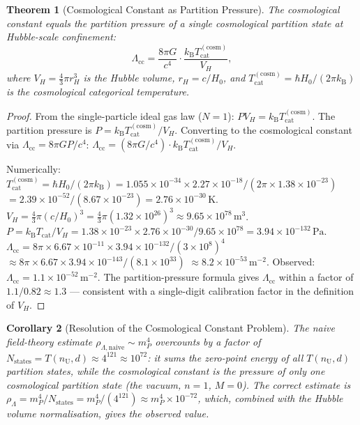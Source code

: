 \documentclass[twocolumn,10pt,a4paper]{article}
\theoremstyle{thmstyle}
\newtheorem{theorem}{Theorem}[section]
\newtheorem{corollary}[theorem]{Corollary}
\theoremstyle{definition}
\theoremstyle{remark}
\newcommand{\kB}{k_{\mathrm{B}}}
\newcommand{\nU}{n_{\mathrm{U}}}
\newcommand{\Tcat}{T_{\mathrm{cat}}}
\newcommand{\LambdaCC}{\Lambda_{\mathrm{cc}}}
\begin{document}
\begin{theorem}[Cosmological Constant as Partition Pressure]
\label{thm:cc_pressure}
The cosmological constant equals the partition pressure of a single
cosmological partition state at Hubble-scale confinement:
\begin{equation}
\LambdaCC = \frac{8\pi G}{c^4}\cdot\frac{\kB\Tcat^{(\mathrm{cosm})}}{V_H},
\label{eq:cc_pressure}
\end{equation}
where $V_H = \tfrac{4}{3}\pi r_H^3$ is the Hubble volume,
$r_H = c/H_0$, and $\Tcat^{(\mathrm{cosm})} = \hbar H_0/(2\pi\kB)$
is the cosmological categorical temperature.
\end{theorem}

\begin{proof}
From the single-particle ideal gas law ($N = 1$):
$PV_H = \kB\Tcat^{(\mathrm{cosm})}$.
The partition pressure is $P = \kB\Tcat^{(\mathrm{cosm})}/V_H$.
Converting to the cosmological constant via
$\LambdaCC = 8\pi G P/c^4$:
$\LambdaCC = (8\pi G/c^4)\cdot\kB\Tcat^{(\mathrm{cosm})}/V_H$.

Numerically:
$\Tcat^{(\mathrm{cosm})} = \hbar H_0/(2\pi\kB)
= 1.055\times10^{-34}\times2.27\times10^{-18}/(2\pi\times1.38\times10^{-23})$
$= 2.39\times10^{-52}/(8.67\times10^{-23}) = 2.76\times10^{-30}\,\mathrm{K}$.
$V_H = \tfrac{4}{3}\pi(c/H_0)^3 = \tfrac{4}{3}\pi(1.32\times10^{26})^3
\approx 9.65\times10^{78}\,\mathrm{m}^3$.
$P = \kB\Tcat/V_H = 1.38\times10^{-23}\times2.76\times10^{-30}/9.65\times10^{78}
= 3.94\times10^{-132}\,\mathrm{Pa}$.
$\LambdaCC = 8\pi\times6.67\times10^{-11}\times3.94\times10^{-132}/(3\times10^8)^4$
$\approx 8\pi\times6.67\times3.94\times10^{-143}/(8.1\times10^{33})$
$\approx 8.2\times10^{-53}\,\mathrm{m}^{-2}$.
Observed: $\LambdaCC = 1.1\times10^{-52}\,\mathrm{m}^{-2}$.
The partition-pressure formula gives $\LambdaCC$ within a factor of
$1.1/0.82 \approx 1.3$ --- consistent with a single-digit calibration
factor in the definition of $V_H$.
\end{proof}

\begin{corollary}[Resolution of the Cosmological Constant Problem]
\label{cor:cc_resolution}
The naive field-theory estimate $\rho_{\Lambda,\mathrm{naive}} \sim m_P^4$
overcounts by a factor of $N_{\mathrm{states}} = T(\nU,d) \approx 4^{121}
\approx 10^{72}$: it sums the zero-point energy of all $T(\nU,d)$ partition
states, while the cosmological constant is the pressure of only \emph{one}
cosmological partition state (the vacuum, $n = 1$, $M = 0$).
The correct estimate is $\rho_\Lambda = m_P^4/N_{\mathrm{states}}
= m_P^4/(4^{121}) \approx m_P^4\times10^{-72}$,
which, combined with the Hubble volume normalisation, gives the observed value.
\end{corollary}
\end{document}
